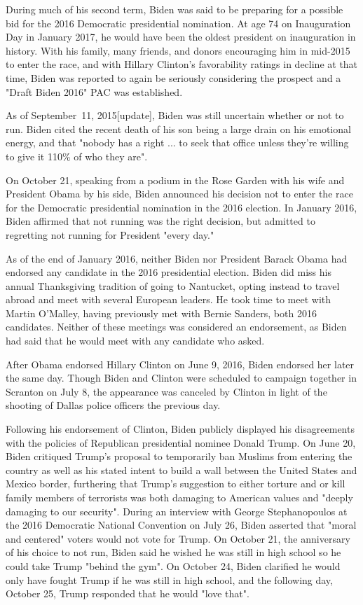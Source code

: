 During much of his second term, Biden was said to be preparing for a
possible bid for the 2016 Democratic presidential nomination. At age 74
on Inauguration Day in January 2017, he would have been the oldest
president on inauguration in history. With his family, many friends, and
donors encouraging him in mid-2015 to enter the race, and with Hillary
Clinton's favorability ratings in decline at that time, Biden was
reported to again be seriously considering the prospect and a "Draft
Biden 2016" PAC was established.

As of September~11, 2015{[}update{]}, Biden was still uncertain whether
or not to run. Biden cited the recent death of his son being a large
drain on his emotional energy, and that "nobody has a right ... to seek
that office unless they're willing to give it 110\% of who they are".

On October 21, speaking from a podium in the Rose Garden with his wife
and President Obama by his side, Biden announced his decision not to
enter the race for the Democratic presidential nomination in the 2016
election. In January 2016, Biden affirmed that not running was the right
decision, but admitted to regretting not running for President "every
day."

As of the end of January 2016, neither Biden nor President Barack Obama
had endorsed any candidate in the 2016 presidential election. Biden did
miss his annual Thanksgiving tradition of going to Nantucket, opting
instead to travel abroad and meet with several European leaders. He took
time to meet with Martin O'Malley, having previously met with Bernie
Sanders, both 2016 candidates. Neither of these meetings was considered
an endorsement, as Biden had said that he would meet with any candidate
who asked.

After Obama endorsed Hillary Clinton on June 9, 2016, Biden endorsed her
later the same day. Though Biden and Clinton were scheduled to campaign
together in Scranton on July 8, the appearance was canceled by Clinton
in light of the shooting of Dallas police officers the previous day.

Following his endorsement of Clinton, Biden publicly displayed his
disagreements with the policies of Republican presidential nominee
Donald Trump. On June 20, Biden critiqued Trump's proposal to
temporarily ban Muslims from entering the country as well as his stated
intent to build a wall between the United States and Mexico border,
furthering that Trump's suggestion to either torture and or kill family
members of terrorists was both damaging to American values and "deeply
damaging to our security". During an interview with George
Stephanopoulos at the 2016 Democratic National Convention on July 26,
Biden asserted that "moral and centered" voters would not vote for
Trump. On October 21, the anniversary of his choice to not run, Biden
said he wished he was still in high school so he could take Trump
"behind the gym". On October 24, Biden clarified he would only have
fought Trump if he was still in high school, and the following day,
October 25, Trump responded that he would "love that".

